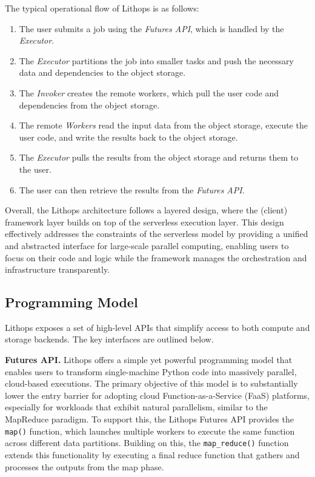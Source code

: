 The typical operational flow of Lithops is as follows:
\begin{enumerate}
    \item The user submits a job using the \textit{Futures API}, which is handled by the \textit{Executor}.
    \item The \textit{Executor} partitions the job into smaller tasks and push the necessary data and dependencies to the object storage.
    \item The \textit{Invoker} creates the remote workers, which pull the user code and dependencies from the object storage.
    \item The remote \textit{Workers} read the input data from the object storage, execute the user code, and write the results back to the object storage.
    \item The \textit{Executor} pulls the results from the object storage and returns them to the user.
    \item The user can then retrieve the results from the\textit{ Futures API}.
\end{enumerate}


Overall, the Lithops architecture follows a layered design, where the (client) framework layer builds on top of the serverless execution layer. This design effectively addresses the constraints of the serverless model by providing a unified and abstracted interface for large-scale parallel computing, enabling users to focus on their code and logic while the framework manages the orchestration and infrastructure transparently.


\subsection{Programming Model}
Lithops exposes a set of high-level APIs that simplify access to both compute and storage backends. The key interfaces are outlined below.


\noindent
\vspace{0.5em} \textbf{Futures API.  } Lithops offers a simple yet powerful programming model that enables users to transform single-machine Python code into massively parallel, cloud-based executions. The primary objective of this model is to substantially lower the entry barrier for adopting cloud Function-as-a-Service (FaaS) platforms, especially for workloads that exhibit natural parallelism, similar to the MapReduce paradigm. To support this, the Lithops Futures API provides the \texttt{map()} function, which launches multiple workers to execute the same function across different data partitions. Building on this, the \texttt{map_reduce()} function extends this functionality by executing a final reduce function that gathers and processes the outputs from the map phase.

